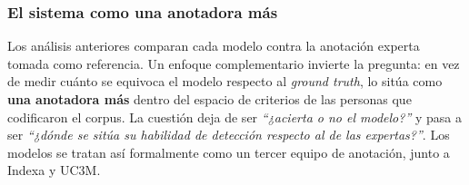 \begin{table}[H]
    \centering
    \begingroup
    \scriptsize
    \renewcommand{\texttt}[1]{{\ttfamily #1}}
    \endgroup
\end{table}

\subsubsection{El sistema como una anotadora más}
\label{subsec:iris_equipo_ia}

Los análisis anteriores comparan cada modelo contra la anotación experta tomada
como referencia. Un enfoque complementario invierte la pregunta: en vez de medir
cuánto se equivoca el modelo respecto al \textit{ground truth}, lo sitúa como \textbf{una
anotadora más} dentro del espacio de criterios de las personas que codificaron el
corpus. La cuestión deja de ser \textit{``¿acierta o no el modelo?''} y pasa a ser \textit{``¿dónde se sitúa su
habilidad de detección respecto al de las expertas?''}. Los modelos se tratan así formalmente como un tercer
equipo de anotación, junto a Indexa y UC3M.

